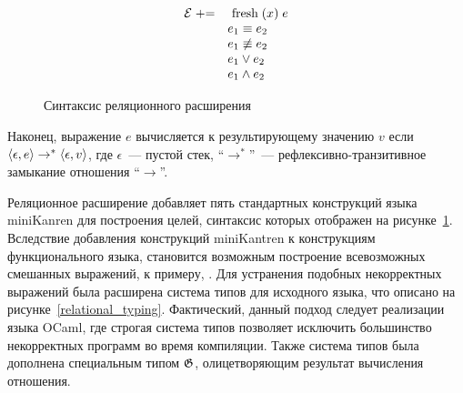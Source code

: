 \begin{figure}
\centering
$$
\begin{array}{rl}
\mathcal E\mathrel{{+}{=}}&\Fresh{x} \;e\\
                    &e_1\equiv e_2\\
                    &e_1\not\equiv e_2\\
                    &e_1\vee e_2\\
                    &e_1\wedge e_2
\end{array}
$$
\caption{Синтаксис реляционного расширения}
\label{relational_syntax}
\end{figure}

Наконец, выражение $e$ вычисляется к результирующему значению $v$ если
$\left<{\epsilon, e}\right> \to^* \left<{\epsilon, v}\right>$, где $\epsilon$~--- пустой стек, ``$\to^*$''~--- рефлексивно-транзитивное замыкание отношения ``$\to$''.

Реляционное расширение добавляет пять стандартных конструкций языка miniKanren для построения целей, синтаксис которых отображен на рисунке~\ref{relational_syntax}. Вследствие добавления конструкций miniKantren к конструкциям функционального языка, становится возможным построение всевозможных смешанных выражений, к примеру, . Для устранения подобных некорректных выражений была расширена система типов для исходного языка, что описано на рисунке~\ref{relational_typing}. Фактический, данный подход следует реализации языка OCaml, где строгая система типов позволяет исключить большинство некорректных программ во время компиляции. Также система типов была дополнена специальным типом $\mathfrak G$, олицетворяющим результат вычисления отношения.

